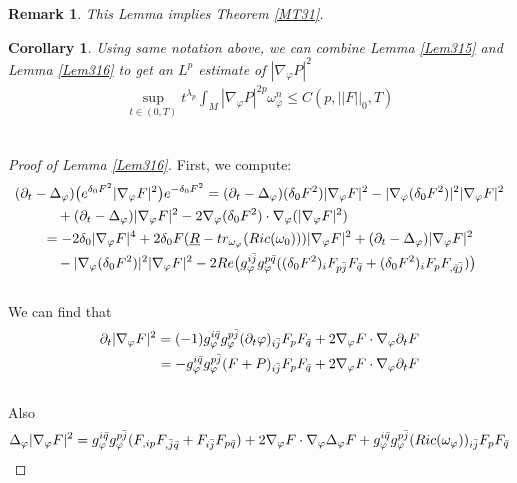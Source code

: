 \documentclass[11pt]{amsart}
\newtheorem{cor}[lem]{Corollary}
\newtheorem{rem}[lem]{Remark}
\numberwithin{equation}{section}
\begin{document}
\begin{rem}
	This Lemma implies Theorem \ref{MT31}. 
\end{rem}

\begin{cor}
	Using same notation above, we can combine Lemma \ref{Lem315} and Lemma \ref{Lem316} to get an $L^p$ estimate of $|\nabla_\varphi P|^2$ 
	\begin{align}
		\sup_{t\in (0,T)} t^{\lambda_p} \int_M |\nabla_\varphi P|^{2p}\omega_\varphi^n \le  C(p,||F||_0,T)
	\end{align}\\
\end{cor}


\begin{proof}[Proof of Lemma \ref{Lem316}]
First, we compute:
\begin{align}
	& (\partial_t-\Delta_{\varphi})\big(e^{\delta_0F^2}|\nabla_{\varphi}F|^2\big)e^{-\delta_0F^2} =(\partial_t-\Delta_{\varphi})(\delta_0F^2)|\nabla_{\varphi}F|^2-|\nabla_{\varphi}(\delta_0F^2)|^2|\nabla_{\varphi}F|^2 \notag \\
	&\qquad \quad +(\partial_t-\Delta_{\varphi})|\nabla_{\varphi}F|^2-2\nabla_{\varphi}(\delta_0F^2)\cdot \nabla_{\varphi}(|\nabla_{\varphi}F|^2) \notag\\
	&\qquad = -2\delta_0|\nabla_{\varphi}F|^4 + 2\delta_0F(\underline{R}-tr_{\omega_{\varphi}}(Ric(\omega_0)))|\nabla_{\varphi}F|^2 + (\partial_t-\Delta_{\varphi})|\nabla_{\varphi}F|^2 \notag\\
	&\qquad \quad -|\nabla_{\varphi}(\delta_0F^2)|^2|\nabla_{\varphi}F|^2 - 2Re\big(g_{\varphi}^{i\bar{j}}g_{\varphi}^{p\bar{q}}((\delta_0 F^2)_iF_{p\bar{j}}F_{\bar{q}}+(\delta_0 F^2)_iF_pF_{,\bar{q}\bar{j}})\big) 
\end{align}\\
We can find that
\begin{align}
	\partial_t|\nabla_{\varphi}F|^2=(-1)g_{\varphi}^{i\bar{q}}g_{\varphi}^{p\bar{j}}(\partial_t\varphi)_{i\bar{j}}F_pF_{\bar{q}}+2\nabla_{\varphi}F\cdot \nabla_{\varphi}\partial_t F \notag\\
	= - g_{\varphi}^{i\bar{q}}g_{\varphi}^{p\bar{j}}(F+P)_{i\bar{j}}F_pF_{\bar{q}}+2\nabla_{\varphi}F\cdot \nabla_{\varphi}\partial_t F
\end{align}\\
Also
\begin{align}
	\Delta_{\varphi}|\nabla_{\varphi}F|^2 = g_{\varphi}^{i\bar{q}}g_{\varphi}^{p\bar{j}}(F_{,ip}F_{,\bar{j}\bar{q}}+F_{i\bar{j}}F_{p\bar{q}}) + 2\nabla_{\varphi}F\cdot \nabla_{\varphi}\Delta_{\varphi}F + g_{\varphi}^{i\bar{q}}g_{\varphi}^{p\bar{j}}(Ric(\omega_{\varphi}))_{i\bar{j}}F_pF_{\bar{q}} \notag\\

\end{align}
\end{proof}
\end{document}
